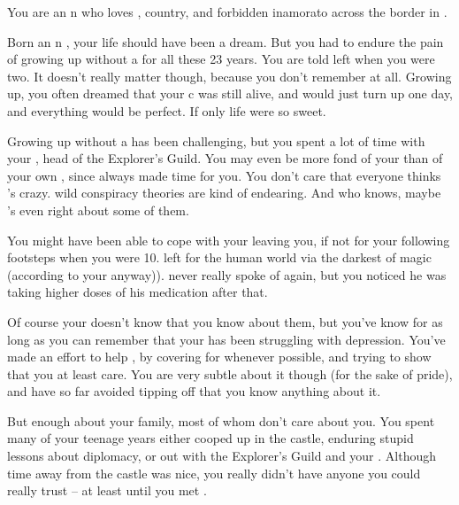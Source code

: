 \documentclass[char]{NeptuneBall}
\begin{document}
\name{\cPrincess{}}

You are an \pAtlantis{}n \cPrincess{\prince} who loves \cPrincess{\them} \cKing{\parent}, \cPrincess{\them} country, and \cPrincess{\them} forbidden inamorato across the border in \pPacifica{}.

Born an \pAtlantis{}n \cPrincess{\prince}, your life should have been a dream. But you had to endure the pain of growing up without a \cQueen{\parent} for all these 23 years. You are told \cQueen{\they} left when you were two. It doesn't really matter though, because you don't remember \cQueen{\them} at all. Growing up, you often dreamed that your c\cQueen{\parent} was still alive, and would just turn up one day, and everything would be perfect. If only life were so sweet.

Growing up without a \cQueen{\parent} has been challenging, but you spent a lot of time with your \cPlant{\uncle} \cPlant{}, head of the Explorer's Guild. You may even be more fond of your \cPlant{\uncle} than of your own \cKing{\parent}, since \cPlant{} always made time for you. You don't care that everyone thinks \cPlant{\they}'s crazy. \cPlant{\Their} wild conspiracy theories are kind of endearing. And who knows, maybe \cPlant{\they}'s even right about some of them.

You might have been able to cope with your \cQueen{\parent} leaving you, if not for your \cAriel{\sibling} following \cQueen{\them} footsteps when you were 10. \cAriel{} left for the human world via the darkest of magic (according to your \cKing{\parent} anyway)). \cKing{\They} never really spoke of \cAriel{\them|} again, but you noticed he was taking higher doses of his medication after that.

Of course your \cKing{\parent} doesn't know that you know about them, but you've know for as long as you can remember that your \cKing{\parent} has been struggling with depression. You've made an effort to help \cKing{\them}, by covering for \cKing{\them} whenever possible, and trying to show \cKing{\them} that you at least care. You are very subtle about it though (for the sake of \cKing{\their} pride), and have so far avoided tipping \cKing{\them} off that you know anything about it.

But enough about your family, most of whom don't care about you. You spent many of your teenage years either cooped up in the castle, enduring stupid lessons about diplomacy, or out with the Explorer's Guild and your \cPlant{\uncle}. Although time away from the castle was nice, you really didn't have anyone you could really trust -- at least until you met \emph{\cDiplomat{\them}}.
\end{document}
